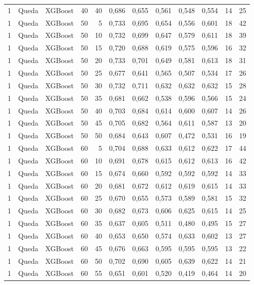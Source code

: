 \begin{longtable}{@{}rllrrrrrrrrr@{}}
1 & Queda & XGBoost & 40 & 40 & 0,686 & 0,655 & 0,561 & 0,548 & 0,554 & 14 & 25 \\
1 & Queda & XGBoost & 50 & 5 & 0,733 & 0,695 & 0,654 & 0,556 & 0,601 & 18 & 42 \\
1 & Queda & XGBoost & 50 & 10 & 0,732 & 0,699 & 0,647 & 0,579 & 0,611 & 18 & 39 \\
1 & Queda & XGBoost & 50 & 15 & 0,720 & 0,688 & 0,619 & 0,575 & 0,596 & 16 & 32 \\
1 & Queda & XGBoost & 50 & 20 & 0,733 & 0,701 & 0,649 & 0,581 & 0,613 & 18 & 31 \\
1 & Queda & XGBoost & 50 & 25 & 0,677 & 0,641 & 0,565 & 0,507 & 0,534 & 17 & 26 \\
1 & Queda & XGBoost & 50 & 30 & 0,732 & 0,711 & 0,632 & 0,632 & 0,632 & 15 & 28 \\
1 & Queda & XGBoost & 50 & 35 & 0,681 & 0,662 & 0,538 & 0,596 & 0,566 & 15 & 24 \\
1 & Queda & XGBoost & 50 & 40 & 0,703 & 0,684 & 0,614 & 0,600 & 0,607 & 14 & 26 \\
1 & Queda & XGBoost & 50 & 45 & 0,705 & 0,682 & 0,564 & 0,611 & 0,587 & 13 & 20 \\
1 & Queda & XGBoost & 50 & 50 & 0,684 & 0,643 & 0,607 & 0,472 & 0,531 & 16 & 19 \\
1 & Queda & XGBoost & 60 & 5 & 0,704 & 0,688 & 0,633 & 0,612 & 0,622 & 17 & 44 \\
1 & Queda & XGBoost & 60 & 10 & 0,691 & 0,678 & 0,615 & 0,612 & 0,613 & 16 & 42 \\
1 & Queda & XGBoost & 60 & 15 & 0,674 & 0,660 & 0,592 & 0,592 & 0,592 & 14 & 33 \\
1 & Queda & XGBoost & 60 & 20 & 0,681 & 0,672 & 0,612 & 0,619 & 0,615 & 14 & 33 \\
1 & Queda & XGBoost & 60 & 25 & 0,670 & 0,655 & 0,573 & 0,589 & 0,581 & 15 & 32 \\
1 & Queda & XGBoost & 60 & 30 & 0,682 & 0,673 & 0,606 & 0,625 & 0,615 & 14 & 25 \\
1 & Queda & XGBoost & 60 & 35 & 0,637 & 0,605 & 0,511 & 0,480 & 0,495 & 15 & 27 \\
1 & Queda & XGBoost & 60 & 40 & 0,653 & 0,650 & 0,574 & 0,633 & 0,602 & 13 & 27 \\
1 & Queda & XGBoost & 60 & 45 & 0,676 & 0,663 & 0,595 & 0,595 & 0,595 & 13 & 22 \\
1 & Queda & XGBoost & 60 & 50 & 0,702 & 0,690 & 0,605 & 0,639 & 0,622 & 14 & 21 \\
1 & Queda & XGBoost & 60 & 55 & 0,651 & 0,601 & 0,520 & 0,419 & 0,464 & 14 & 20 \\

\end{longtable}
